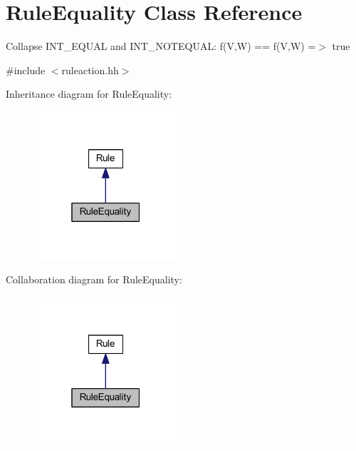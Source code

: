 \hypertarget{class_rule_equality}{}\section{Rule\+Equality Class Reference}
\label{class_rule_equality}


Collapse I\+N\+T\+\_\+\+E\+Q\+U\+AL and I\+N\+T\+\_\+\+N\+O\+T\+E\+Q\+U\+AL\+: {\ttfamily f(\+V,\+W) == f(\+V,\+W) =$>$ true}  




{\ttfamily \#include $<$ruleaction.\+hh$>$}



Inheritance diagram for Rule\+Equality\+:
\nopagebreak
\begin{figure}[H]
\begin{center}
\leavevmode
\includegraphics[width=151pt]{class_rule_equality__inherit__graph}
\end{center}
\end{figure}


Collaboration diagram for Rule\+Equality\+:
\nopagebreak
\begin{figure}[H]
\begin{center}
\leavevmode
\includegraphics[width=151pt]{class_rule_equality__coll__graph}
\end{center}
\end{figure}

